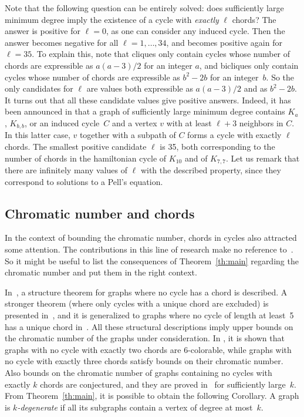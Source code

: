 \documentclass[11pt]{article}
\begin{document}
    Note that the following question can be entirely solved: does sufficiently large minimum degree imply the existence of a cycle with \emph{exactly} $\ell$ chords? The answer is positive for $\ell =0$, as one can consider any induced cycle. Then the answer becomes negative for all $\ell=1,\dots ,34$, and becomes positive again for $\ell=35$. To explain this, note that cliques only contain cycles whose number of chords are expressible as $a(a-3)/2$ for an integer $a$, and bicliques only contain cycles whose number of chords are expressible as $b^2-2b$ for an integer~$b$. So the only candidates for $\ell$ are values both expressible as $a(a-3)/2$ and as $b^2-2b$. It turns out that all these candidate values give positive answers. Indeed,  it has been announced in \cite{pc} that  a graph of sufficiently large minimum degree contains $K_a$, $K_{b,b}$, or an induced cycle~$C$ and a vertex $v$ with at least $\ell+3$ neighbors in $C$. In this latter case, $v$ together with a subpath of $C$ forms a cycle with exactly $\ell$ chords. The smallest positive candidate $\ell$ is 35, both corresponding to the number of chords in the hamiltonian cycle of  $K_{10}$ and of $K_{7,7}$.  Let us remark that there are infinitely many values of $\ell$ with the described property, since they correspond to solutions to a Pell's equation.

\subsection*{Chromatic number and chords}

In the context of bounding the chromatic number, chords in cycles also attracted some attention. The contributions in this line of research make no reference to~\cite{GUPTA198037}. So it might be useful to  list  the consequences of Theorem~\ref{th:main} regarding the chromatic number and put them in the right context. 

In~\cite{mft:chordless}, a structure theorem for graphs where no cycle has a chord is described. A stronger theorem (where only cycles with a unique chord are excluded) is presented in~\cite{nicolas.kristina:one}, and it is generalized to graphs where no cycle of length at least~5 has a unique chord in~\cite{DBLP:journals/jgt/TrotignonP18}. All these structural descriptions imply upper bounds on the chromatic number of the graphs under consideration. In \cite{DBLP:journals/dam/AboulkerB15}, it is shown that graphs with no cycle with exactly two chords are 6-colorable, while graphs with no cycle with exactly three chords satisfy bounds on their chromatic number. Also bounds on the chromatic number of graphs containing no cycles with exactly $k$ chords are conjectured, and they are proved in~\cite{leeLP:chords} for sufficiently large~$k$. From Theorem~\ref{th:main}, it is possible to obtain the following Corollary. A graph is \emph{$k$-degenerate} if all its subgraphs contain a vertex of degree at most~$k$. 
\end{document}
